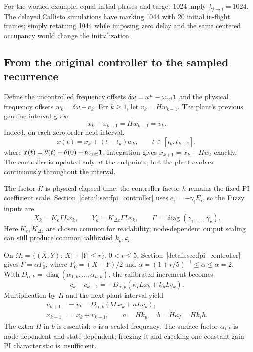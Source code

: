 For the worked example, equal initial phases and target 1024 imply
$\lambda_{j\to i}=1024$. The delayed Callisto simulations have marking 1044 with
20 initial in-flight frames; simply retaining 1044 while imposing zero
delay and the same centered occupancy would change the initialization.

\subsection{From the original controller to the sampled recurrence}

Define the uncontrolled frequency offsets $\delta\omega=\omega^u-\omega_{\rm ref}\mathbf1$
and the physical frequency offsets $w_k=\delta\omega+c_k$. For $k\ge1$,
let $v_k=Hw_{k-1}$. The plant's previous genuine interval gives
\begin{equation}
 x_k-x_{k-1}=Hw_{k-1}=v_k.
 \label{detail:eq:btd_d_plant}
\end{equation}
Indeed, on each zero-order-held interval,
\begin{equation}
 x(t)=x_k+(t-t_k)w_k,\qquad t\in[t_k,t_{k+1}],
 \label{detail:eq:btd_exact_continuous_flow}
\end{equation}
where $x(t)=\theta(t)-\theta(0)-t\omega_{\rm ref}\mathbf1$.
Integration gives $x_{k+1}=x_k+Hw_k$ exactly. The controller is updated
only at the endpoints, but the plant evolves continuously throughout
the interval.

The factor $H$ is physical elapsed time; the controller factor $h$ remains
the fixed PI coefficient scale. Section~\ref{detail:sec:fpi_controller} uses
$e_i=-\gamma_i E_i$, so the Fuzzy inputs are
\begin{equation}
 X_k=K_e\Gamma Lx_k,\qquad
 Y_k=K_{\Delta e}\Gamma Lv_k,\qquad
 \Gamma=\operatorname{diag}(\gamma_1,\ldots,\gamma_n).
 \label{detail:eq:btd_d_inputs}
\end{equation}
Here $K_e,K_{\Delta e}$ are chosen common for readability; node-dependent
output scaling can still produce common calibrated $k_p,k_i$.

On $\Omega_r=\{(X,Y):|X|+|Y|\le r\}$, $0<r\le5$, Section~\ref{detail:sec:fpi_controller} gives
$F=\alpha F_0$, where $F_0=(X+Y)/2$ and
$\underline\alpha=(1+r/5)^{-1}\le\alpha\le\overline\alpha=2$.
With $D_{\alpha,k}=\operatorname{diag}(\alpha_{1,k},\ldots,\alpha_{n,k})$,
the calibrated increment becomes
\begin{equation}
 c_k-c_{k-1}=-D_{\alpha,k}(\kappa_I Lx_k+k_pLv_k).
 \label{detail:eq:btd_d_command_increment}
\end{equation}
Multiplication by $H$ and the next plant interval yield
\begin{align}
 v_{k+1}&=v_k-D_{\alpha,k}(bLx_k+aLv_k),\nonumber\\
 x_{k+1}&=x_k+v_{k+1},\qquad
 a=Hk_p,\quad b=H\kappa_I=Hk_i h.
 \label{detail:eq:btd_full_recurrence}
\end{align}
The extra $H$ in $b$ is essential: $v$ is a scaled frequency. The surface
factor $\alpha_{i,k}$ is node-dependent and state-dependent; freezing it
and checking one constant-gain PI characteristic is insufficient.


